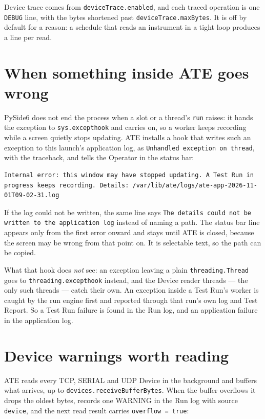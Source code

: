 Device trace comes from \texttt{deviceTrace.enabled}, and each traced operation is one \texttt{DEBUG}
line, with the bytes shortened past \texttt{deviceTrace.maxBytes}. It is off by default for a
reason: a schedule that reads an instrument in a tight loop produces a line per read.

\section{When something inside ATE goes wrong}

PySide6 does not end the process when a slot or a thread's \texttt{run} raises: it hands the
exception to \texttt{sys.excepthook} and carries on, so a worker keeps recording while a screen
quietly stops updating. ATE installs a hook that writes such an exception to this launch's
application log, as \texttt{Unhandled exception on thread}, with the traceback, and tells the
Operator in the status bar:

\begin{lstlisting}[language=ATEShell]
Internal error: this window may have stopped updating. A Test Run in progress keeps recording. Details: /var/lib/ate/logs/ate-app-2026-11-01T09-02-31.log
\end{lstlisting}

If the log could not be written, the same line says \texttt{The details could not be written to the
application log} instead of naming a path. The status bar line appears only from the first error
onward and stays until ATE is closed, because the screen may be wrong from that point on. It is
selectable text, so the path can be copied.

What that hook does \emph{not} see: an exception leaving a plain \texttt{threading.Thread} goes to
\texttt{threading.excepthook} instead, and the Device reader threads --- the only such threads ---
catch their own. An exception inside a Test Run's worker is caught by the run engine first and
reported through that run's own log and Test Report. So a Test Run failure is found in the Run log,
and an application failure in the application log.

\section{Device warnings worth reading}

ATE reads every TCP, SERIAL and UDP Device in the background and buffers what arrives, up to
\texttt{devices.receiveBufferBytes}. When the buffer overflows it drops the oldest bytes, records one
WARNING in the Run log with source \texttt{device}, and the next read result carries
\texttt{overflow = true}:

